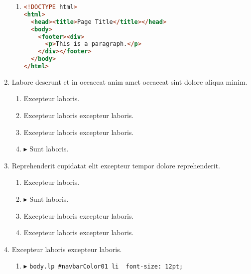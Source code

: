 \documentclass[a4paper,12pt]{article}
\begin{document}
\begin{enumerate}[label=\textbf{\arabic*.}]
\begin{enumerate}
		\item  \hfill \vspace*{-7mm}
    \begin{lstlisting}[language=HTML]
<!DOCTYPE html>
<html>
  <head><title>Page Title</title></head>
  <body>
    <footer><div>
      <p>This is a paragraph.</p>
    </div></footer>
  </body>
</html>
    \end{lstlisting}
  
	\end{enumerate}

\item Labore deserunt et in occaecat anim amet occaecat sint dolore aliqua minim.
\begin{multicols}{2}
	\begin{enumerate}
		\item  Excepteur laboris.
    
		\item  Excepteur laboris excepteur laboris.
    
		\item  Excepteur laboris excepteur laboris.
  
		\item $\blacktriangleright$  Sunt laboris.
    
	\end{enumerate}

\end{multicols}
\item Reprehenderit cupidatat elit excepteur tempor dolore reprehenderit.
\begin{multicols}{2}
	\begin{enumerate}
		\item  Excepteur laboris.
    
		\item $\blacktriangleright$  Sunt laboris.
    
		\item  Excepteur laboris excepteur laboris.
    
		\item  Excepteur laboris excepteur laboris.
  
	\end{enumerate}

\end{multicols}
\item Excepteur laboris excepteur laboris.
	\begin{enumerate}
		\item $\blacktriangleright$  \texttt{body.lp \#navbarColor01 li { font-size: 12pt; }}
    

\end{enumerate}
\end{enumerate}
\end{document}
